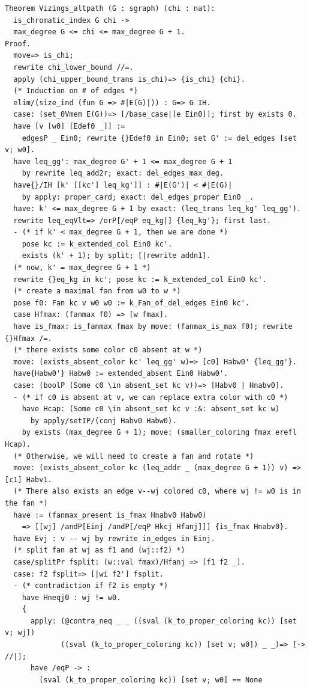 \begin{verbatim}
Theorem Vizings_altpath (G : sgraph) (chi : nat): 
  is_chromatic_index G chi -> 
  max_degree G <= chi <= max_degree G + 1.
Proof.
  move=> is_chi; 
  rewrite chi_lower_bound //=.
  apply (chi_upper_bound_trans is_chi)=> {is_chi} {chi}.
  (* Induction on # of edges *)
  elim/(size_ind (fun G => #|E(G)|)) : G=> G IH.
  case: (set_0Vmem E(G))=> [/base_case|[e Ein0]]; first by exists 0.
  have [v [w0] [Edef0 _]] := 
    edgesP _ Ein0; rewrite {}Edef0 in Ein0; set G' := del_edges [set v; w0].
  have leq_gg': max_degree G' + 1 <= max_degree G + 1
    by rewrite leq_add2r; exact: del_edges_max_deg. 
  have{}/IH [k' [[kc'] leq_kg']] : #|E(G')| < #|E(G)| 
    by apply: proper_card; exact: del_edges_proper Ein0 _.
  have: k' <= max_degree G + 1 by exact: (leq_trans leq_kg' leq_gg').
  rewrite leq_eqVlt=> /orP[/eqP eq_kg|] {leq_kg'}; first last.
  - (* if k' < max_degree G + 1, then we are done *) 
    pose kc := k_extended_col Ein0 kc'.
    exists (k' + 1); by split; [|rewrite addn1].
  (* now, k' = max_degree G + 1 *)
  rewrite {}eq_kg in kc'; pose kc := k_extended_col Ein0 kc'.
  (* create a maximal fan from w0 to w *)
  pose f0: Fan kc v w0 w0 := k_Fan_of_del_edges Ein0 kc'.
  case Hfmax: (fanmax f0) => [w fmax].
  have is_fmax: is_fanmax fmax by move: (fanmax_is_max f0); rewrite {}Hfmax /=.
  (* there exists some color c0 absent at w *)
  move: (exists_absent_color kc' leq_gg' w)=> [c0] Habw0' {leq_gg'}.
  have{Habw0'} Habw0 := extended_absent Ein0 Habw0'.
  case: (boolP (Some c0 \in absent_set kc v))=> [Habv0 | Hnabv0].
  - (* if c0 is absent at v, we can replace extra color with c0 *)
    have Hcap: (Some c0 \in absent_set kc v :&: absent_set kc w) 
      by apply/setIP/(conj Habv0 Habw0).
    by exists (max_degree G + 1); move: (smaller_coloring fmax erefl Hcap).
  (* Otherwise, we will need to create a fan and rotate *)
  move: (exists_absent_color kc (leq_addr _ (max_degree G + 1)) v) => [c1] Habv1. 
  (* There also exists an edge v--wj colored c0, where wj != w0 is in the fan *)
  have := (fanmax_present is_fmax Hnabv0 Habw0)
    => [[wj] /andP[Einj /andP[/eqP Hkcj Hfanj]]] {is_fmax Hnabv0}.
  have Evj : v -- wj by rewrite in_edges in Einj.
  (* split fan at wj as f1 and (wj::f2) *)
  case/splitPr fsplit: (w::val fmax)/Hfanj => [f1 f2 _].
  case: f2 fsplit=> [|wi f2'] fsplit.
  - (* contradiction if f2 is empty *)
    have Hneqj0 : wj != w0.
    { 
      apply: (@contra_neq _ _ ((sval (k_to_proper_coloring kc)) [set v; wj]) 
             ((sval (k_to_proper_coloring kc)) [set v; w0]) _ _)=> [-> //|];
      have /eqP -> : 
        (sval (k_to_proper_coloring kc)) [set v; w0] == None 

\end{verbatim}
